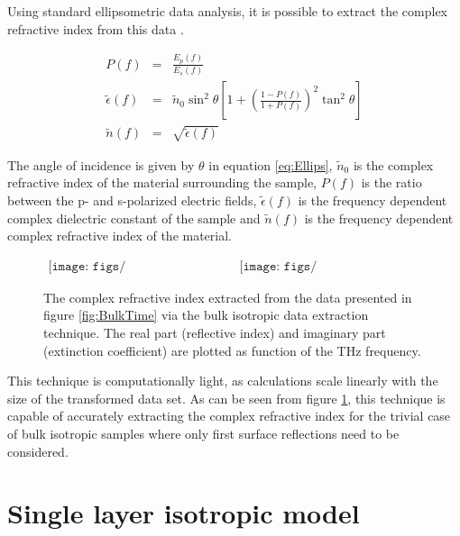 Using standard ellipsometric data analysis, it is possible to extract the complex refractive index from this data \cite{Tompkins-2005}.

\begin{eqnarray}
P(f) &=& \frac{E_{p}(f)}{E_{s}(f)}\\
\widetilde{\epsilon}(f) &=& \widetilde{n}_{0}\sin^{2}{\theta}\left[1 + \left(\frac{1-P(f)}{1+P(f)}\right)^{2}\tan^{2}{\theta}\right]
\label{eq:Ellips}\\
\widetilde{n}(f) &=& \sqrt{\widetilde{\epsilon}(f)}
\end{eqnarray}

The angle of incidence is given by $\theta$ in equation \ref{eq:Ellips}, $\widetilde{n}_{0}$ is the complex refractive index of the material surrounding the sample, $P(f)$ is the ratio between the p- and s-polarized electric fields, $\widetilde{\epsilon}(f)$ is the frequency dependent complex dielectric constant of the sample and $\widetilde{n}(f)$ is the frequency dependent complex refractive index of the material.

\begin{figure}[H]
                \begin{center}$
								\begin{array}{cc}
                \texttt{[image: figs/Bulk\_n(n2\_5k60d2).png]}&
                \texttt{[image: figs/Bulk\_k(n2\_5k60d2).png]}
								\end{array}$
								\end{center}
	\caption[Extract complex refractive index of bulk isotropic example]{The complex refractive index extracted from the data presented in figure \ref{fig:BulkTime} via the bulk isotropic data extraction technique. The real part (reflective index) and imaginary part (extinction coefficient) are plotted as function of the THz frequency.}
	\label{fig:BulkExt}
\end{figure}

This technique is computationally light, as calculations scale linearly with the size of the transformed data set. As can be seen from figure \ref{fig:BulkExt}, this technique is capable of accurately extracting the complex refractive index for the trivial case of bulk isotropic samples where only first surface reflections need to be considered.

\section{Single layer isotropic model}
\label{sec:SLM}

